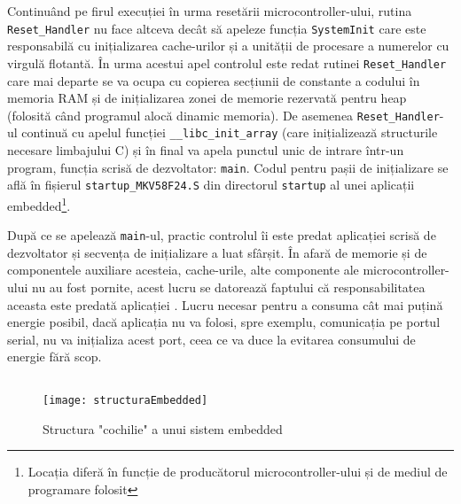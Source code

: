 \documentclass[12pt,a4paper,titlepage]{report}
\begin{document}
Continuând pe firul execuției în urma resetării microcontroller-ului, rutina \texttt{Reset\_Handler} nu face altceva decât să 
apeleze funcția \texttt{SystemInit} care este responsabilă cu inițializarea cache-urilor și a unității de procesare a numerelor cu virgulă flotantă. În urma acestui apel controlul este redat rutinei \texttt{Reset\_Handler} care mai departe se va ocupa cu copierea secțiunii de constante a codului în memoria RAM și de inițializarea zonei de memorie rezervată pentru heap (folosită când programul alocă dinamic memoria). De asemenea \texttt{Reset\_Handler}-ul continuă cu apelul funcției \texttt{\_\_libc\_init\_array} (care inițializează structurile necesare limbajului C) și în final va apela punctul unic de intrare într-un program, funcția scrisă de dezvoltator: \texttt{main}.
Codul pentru pașii de inițializare se află în fișierul \texttt{startup\_MKV58F24.S} din directorul \texttt{startup} al unei aplicații embedded\footnote{Locația diferă în funcție de producătorul microcontroller-ului și de mediul de programare folosit}.

După ce se apelează \texttt{main}-ul, practic controlul îi este predat aplicației scrisă de dezvoltator și secvența de inițializare a luat sfârșit. În afară de memorie și de componentele auxiliare acesteia, cache-urile, alte componente ale microcontroller-ului nu au fost pornite, acest lucru se datorează faptului că responsabilitatea aceasta este predată aplicației . Lucru necesar pentru a consuma cât mai puțină energie posibil, dacă aplicația nu va folosi, spre exemplu, comunicația pe portul serial, nu va inițializa acest port, ceea ce va duce la evitarea consumului de energie fără scop.

\inputminted{asm}{reset_handler.s}

\begin{figure}[h]
    \centering
    \texttt{[image: structuraEmbedded]}
    \caption{Structura "cochilie" a unui sistem embedded}
    \label{shellEmbedded}
\end{figure}
\end{document}
